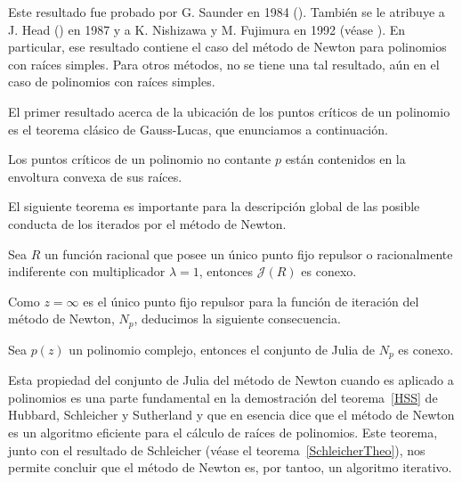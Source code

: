 Este resultado fue probado por G. Saunder en 1984 (\cite{Saunder}). También se le atribuye a J. Head  (\cite{Head}) en 1987 y a K. Nishizawa y M. Fujimura en 1992 (véase \cite{Nishizawa}). En particular, ese resultado contiene el caso del método de Newton para polinomios con raíces simples. Para otros métodos, no se tiene una tal resultado, aún en el caso de polinomios con raíces simples.%

El primer resultado acerca de la ubicación de los puntos
críticos de un polinomio es el teorema clásico de Gauss-Lucas, que enunciamos a continuación.

\begin{teorema}
Los puntos críticos de un polinomio no contante $p$ están
contenidos en la envoltura convexa de sus  raíces.
\end{teorema}


El siguiente teorema es importante para la descripción global de las posible conducta de los iterados por el método de Newton.


\begin{teorema}
Sea $R$ un función racional que posee un único punto fijo repulsor o racionalmente indiferente con multiplicador $\lambda=1$, entonces ${\mathcal J}(R)$ es conexo.
\end{teorema}

Como $z=\infty$ es el único punto fijo repulsor para la función de iteración del método de Newton, $N_p$, deducimos la siguiente consecuencia.

\begin{corolario}
Sea $p(z)$ un polinomio complejo, entonces el conjunto de Julia de $N_p$ es conexo.
\end{corolario}

\begin{nota}
Esta propiedad del conjunto de Julia del método de Newton cuando es aplicado a polinomios es una parte fundamental en la demostración del teorema~\ref{HSS} de Hubbard, Schleicher y Sutherland y que en esencia dice que el método de Newton es un algoritmo eficiente para el cálculo de raíces de polinomios. Este teorema, junto con el resultado de Schleicher (véase el teorema~\ref{SchleicherTheo}), nos permite concluir que el método de Newton es, por tantoo, un algoritmo iterativo.%
\end{nota}

